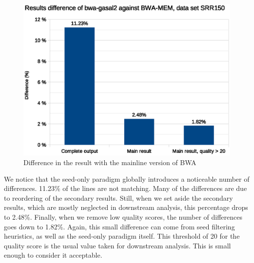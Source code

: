 \begin{figure}[h!]
	\centering
	\includegraphics[width=1\linewidth]{srr150/score-check}
	\caption{Difference in the result with the mainline version of BWA}
	\label{fig:result-diff-srr150}
\end{figure}

We notice that the seed-only paradigm globally introduces a noticeable number of differences. 11.23\% of the lines are not matching. Many of the differences are due to reordering of the secondary results. Still, when we set aside the secondary results, which are mostly neglected in downstream analysis, this percentage drops to 2.48\%. Finally, when we remove low quality scores, the number of differences goes down to 1.82\%. Again, this small difference can come from seed filtering heuristics, as well as the seed-only paradigm itself. This threshold of 20 for the quality score is the usual value taken for downstream analysis. This is small enough to consider it acceptable.


